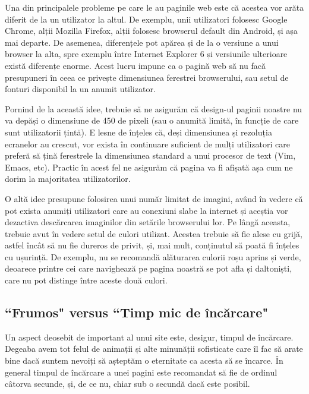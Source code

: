 \documentclass[12pt]{article} %
\begin{document}
Una din principalele probleme pe care le au paginile web este că acestea vor arăta
diferit de la un utilizator la altul. De exemplu, unii utilizatori folosesc Google
Chrome, alții Mozilla Firefox, alții folosesc browserul default din Android, și așa mai
departe. De asemenea, diferențele pot apărea și de la o versiune a unui browser la alta,
spre exemplu între Internet Explorer 6 și versiunile ulterioare există diferențe enorme.
Acest lucru impune ca o pagină web să nu facă presupuneri în ceea ce privește dimensiunea
ferestrei browserului, sau setul de fonturi disponibil la un anumit utilizator.

Pornind de la această idee, trebuie să ne asigurăm că design-ul paginii noastre nu va
depăși o dimensiune de 450 de pixeli (sau o anumită limită, în funcție de care sunt
utilizatorii țintă). E lesne de înțeles că, deși dimensiunea și rezoluția ecranelor au
crescut, vor exista în continuare suficient de mulți utilizatori care preferă să țină
ferestrele la dimensiunea standard a unui procesor de text (Vim, Emacs, etc). Practic
în acest fel ne asigurăm că pagina va fi afișată așa cum ne dorim la majoritatea
utilizatorilor.

O altă idee presupune folosirea unui număr limitat de imagini, având în vedere că pot
exista anumiți utilizatori care au conexiuni slabe la internet și aceștia vor dezactiva
descărcarea imaginilor din setările browserului lor. Pe lângă aceasta, trebuie avut în
vedere setul de culori utilizat. Acestea trebuie să fie alese cu grijă, astfel încât să
nu fie dureros de privit, și, mai mult, conținutul să poată fi înțeles cu ușurință. De
exemplu, nu se recomandă alăturarea culorii roșu aprins și verde, deoarece printre cei
care navighează pe pagina noastră se pot afla și daltoniști, care nu pot distinge între
aceste două culori.


\subsection{``Frumos" versus ``Timp mic de încărcare"} %

Un aspect deosebit de important al unui site este, desigur, timpul de încărcare. Degeaba
avem tot felul de animații și alte minunății sofisticate care îl fac să arate bine dacă
suntem nevoiți să așteptăm o eternitate ca acesta să se încarce. În general timpul de
încărcare a unei pagini este recomandat să fie de ordinul câtorva secunde, și, de ce nu,
chiar sub o secundă dacă este posibil.
\end{document}
